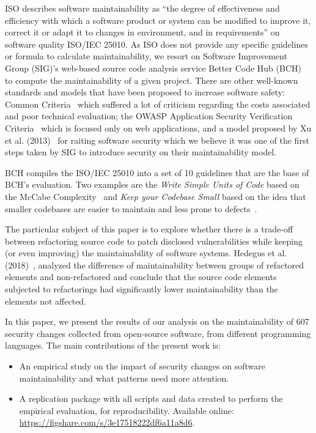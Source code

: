 \documentclass[10pt,conference]{IEEEtran}
\begin{document}
ISO describes software maintainability as ``the degree of effectiveness and
efficiency with which a software product or system can be modified to improve
it, correct it or adapt it to changes in environment, and in requirements'' on
software quality ISO/IEC 25010. As ISO does not provide any specific guidelines or
formula to calculate maintainability, we resort on Software Improvement
Group (SIG)'s web-based source code analysis service Better Code Hub
(BCH)~\cite{Visser:2016:OREILLY} to compute the maintainability of a given
project. There are other well-known standards and models that have been proposed to increase software safety:
Common Criteria~\cite{common:2009} which suffered a lot of criticism regarding the
costs associated and poor technical evaluation; the OWASP
Application Security Verification Criteria~\cite{oswap:2009} which is focused only
on web applications, and a model proposed by Xu et al. (2013)~\cite{6616351} for
raiting software security which we believe it was one of the first steps taken
by SIG to introduce security on their maintainability model.

BCH compiles the ISO/IEC 25010 into a set of 10 guidelines that are the
base of BCH's evaluation. Two examples are the
\emph{Write Simple Units of Code} based on the McCabe Complexity~\cite{1702388}
and \emph{Keep your Codebase Small} based on the idea that smaller codebases are
easier to maintain and less prone to defects~\cite{Visser:2016:OREILLY}. 

The particular subject of this paper is to explore whether there is a trade-off
between refactoring source code to patch disclosed vulnerabilities while keeping
(or even improving) the maintainability of software systems. Hedegus et al. (2018)~\cite{HEGEDUS2018313},
analyzed the difference of maintainability between
groups of refactored elements and non-refactored and conclude that the source
code elements subjected to refactorings had significantly lower maintainability
than the elements not affected.

In this paper, we present the results of our analysis on the maintainability of
607 security changes collected from open-source software, from different
programming languages. The main contributions of the present work is:
\begin{itemize}
	\item An empirical study on the impact of security changes on software
	maintainability and what patterns need more attention.

	\item A replication package with all scripts and data created to perform the
	empirical evaluation, for reproducibility. Available online:
  \url{https://figshare.com/s/3e17518222df6a11a8d6}.

\end{itemize}
\end{document}
